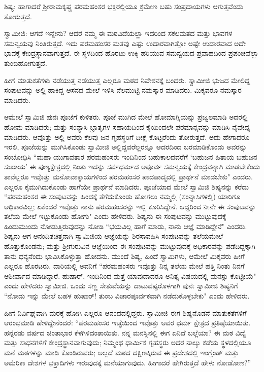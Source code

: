 ಶಿಷ್ಯ: ಹಾಗಾದರೆ ಶ‍್ರೀರಾಮಕೃಷ್ಣ ಪರಮಹಂಸರ ಭಕ್ತರಲ್ಲಿಯೂ ಕ್ರಮೇಣ ಬಹು ಸಂಪ್ರದಾಯಗಳು ಆಗುತ್ತವೆಂದು ತೋರುತ್ತದೆ.

ಸ್ವಾಮೀಜಿ: ಆಗದೆ ಇನ್ನೇನು? ಆದರೆ ನಮ್ಮ ಈ ಮಠವಿದೆಯಲ್ಲಾ ಇದರಿಂದ ಸಕಲಮತದ ಮತ್ತು ಭಾವಗಳ ಸಮನ್ವಯವು ನಿಂತಿರುತ್ತದೆ. ಇದು ಪರಮಹಂಸರ ಮತವು ಎಷ್ಟು ಉದಾರವಾಗಿತ್ತೋ ಅಷ್ಟೇ ಉದಾರವಾದ ಅದೇ ಭಾವಕ್ಕೆ ಕೇಂದ್ರಸ್ಥಾನವಾಗುತ್ತದೆ. ಈ ಸ್ಥಳದಿಂದ ಹೊರಟು ಉಕ್ಕಿ ಹರಿಯುವ ಸಮನ್ವಯದ ಪ್ರವಾಹದಿಂದ ಪ್ರಪಂಚವೆಲ್ಲಾ ತುಂಬಿಹೋಗುತ್ತದೆ.

ಹೀಗೆ ಮಾತುಕತೆಗಳು ನಡೆಯುತ್ತ ನಡೆಯುತ್ತ ಎಲ್ಲರೂ ಮಠದ ನಿವೇಶನಕ್ಕೆ ಬಂದರು. ಸ್ವಾಮೀಜಿ ಭುಜದ ಮೇಲಿದ್ದ ಸಂಪುಟವನ್ನು ಅಲ್ಲಿ ಹಾಕಿದ್ದ ಆಸನದ ಮೇಲೆ ಇಳಿಸಿ ನೆಲಮುಟ್ಟಿ ನಮಸ್ಕಾರ ಮಾಡಿದರು. ಮಿಕ್ಕವರೂ ನಮಸ್ಕಾರ ಮಾಡಿದರು.

ಆಮೇಲೆ ಸ್ವಾಮಿಜಿ ಪುನಃ ಪೂಜೆಗೆ ಕುಳಿತರು. ಪೂಜೆ ಮುಗಿದ ಮೇಲೆ ಹೋಮಾಗ್ನಿಯನ್ನು ಪ್ರಜ್ವಲಮಾಡಿ ಅದರಲ್ಲಿ ಹೋಮ ಮಾಡಿದರು; ಮತ್ತು ಸಂನ್ಯಾಸಿ ಭ್ರಾತೃಗಳ ಸಹಾಯದಿಂದ ಕೈಯಿಂದಲೇ ಪರಮಾನ್ನವನ್ನು ಮಾಡಿಸಿ ನೈವೇದ್ಯ ಮಾಡಿದರು. ಆವೊತ್ತು ಅಲ್ಲಿ ಅವರು ಕೆಲವು ಜನ ಗೃಹಸ್ಥರಿಗೆ ದೀಕ್ಷೆ ಕೊಟ್ಟರೆಂದು ತೋರುತ್ತದೆ. ಅದು ಹೇಗಾದರೂ ಇರಲಿ, ಪೂಜೆಯನ್ನು ಮುಗಿಸಿಕೊಂಡು ಸ್ವಾಮೀಜಿ ಅಲ್ಲಿದ್ದವರೆಲ್ಲರನ್ನೂ ಆದರದಿಂದ ಬರಮಾಡಿಕೊಂಡು ಅವರನ್ನು ಸಂಬೋಧಿಸಿ “ಮಹಾ ಯುಗಾವತಾರ ಪರಮಹಂಸರು ಇಂದಿನಿಂದ ಬಹುಕಾಲದವರೆಗೆ ‘ಬಹುಜನ ಹಿತಾಯ ಬಹುಜನ ಸುಖಾಯ’ ಈ ಪುಣ್ಯಕ್ಷೇತ್ರದಲ್ಲಿ ನಿಂತು ಇದನ್ನು ಸರ್ವಧರ್ಮದ ಅಪೂರ್ವ ಸಮನ್ವಯಕ್ಕೆ ಕೇಂದ್ರವನ್ನಾಗಿ ಮಾಡಬೇಕೆಂದು ತಾವೆಲ್ಲರೂ ಇವೊತ್ತು ಮನೋವಾಕ್ಕಾಯಗಳಿಂದ ಪರಮಹಂಸರ ಪಾದಪಾದ್ಮದಲ್ಲಿ ಪ್ರಾರ್ಥನೆ ಮಾಡಬೇಕು" ಎಂದರು. ಎಲ್ಲರೂ ಕೈಮುಗಿದುಕೊಂಡು ಹಾಗೆಯೇ ಪ್ರಾರ್ಥನೆ ಮಾಡಿದರು. ಪೂಜೆಯಾದ ಮೇಲೆ ಸ್ವಾಮಿಜಿ ಶಿಷ್ಯನನ್ನು ಕರೆದು “ಪರಮಹಂಸರ ಈ ಸಂಪುಟವನ್ನು ಹಿಂದಕ್ಕೆ ತೆಗೆದುಕೊಂಡು ಹೋಗಲು ನಮ್ಮಲ್ಲಿ (ಸಂನ್ಯಾಸಿಗಳಲ್ಲಿ) ಯಾರಿಗೂ ಅಧಿಕಾರವಿಲ್ಲ; ಏಕೆಂದರೆ ಇವೊತ್ತು ನಾನು ಪರಮಹಂಸರನ್ನು ಇಲ್ಲಿ ಕೂರಿಸಿದ್ದೇನೆ. ಆದ್ದರಿಂದ ನೀನೇ ಈ ಸಂಪುಟವನ್ನು ತಲೆಯ ಮೇಲೆ ಇಟ್ಟುಕೊಂಡು ಹೋಗು" ಎಂದು ಹೇಳಿದರು. ಶಿಷ್ಯನು ಈ ಸಂಪುಟವನ್ನು ಮುಟ್ಟುವುದಕ್ಕೆ ಹಿಂದುಮುಂದು ನೋಡುತ್ತಿರುವುದನ್ನು ನೋಡಿ “ಭಯವಿಲ್ಲ ಹಾಗೆ ಮಾಡು, ನಾನು ಆಜ್ಞೆ ಮಾಡಿದ್ದೇನೆ" ಎಂದರು. ಶಿಷ್ಯನು ಆಗ ಆನಂದಿತಚಿತ್ತನಾಗಿ ಸ್ವಾಮಿಜಿಯ ಆಜ್ಞೆಯನ್ನು ಶಿರಸಾವಹಿಸಿ ಸಂಪುಟವನ್ನು ತಲೆಯಮೇಲೆ ಹೊತ್ತುಕೊಂಡನು; ಮತ್ತು ಶ‍್ರೀಗುರುವಿನ ಆಜ್ಞೆಯಿಂದ ಈ ಸಂಪುಟವನ್ನು ಮುಟ್ಟುವುದಕ್ಕೆ ಅಧಿಕಾರವನ್ನು ಪಡೆದಿದ್ದಕ್ಕಾಗಿ ತಾನು ಧನ್ಯನೆಂದು ಭಾವಿಸಿಕೊಳ್ಳುತ್ತಾ ಹೋದನು. ಮುಂದೆ ಶಿಷ್ಯ, ಹಿಂದೆ ಸ್ವಾಮಿಗಳು, ಆಮೇಲೆ ಮಿಕ್ಕವರು ಹೀಗೆ ಎಲ್ಲರೂ ಹೊರಟರು. ದಾರಿಯಲ್ಲಿ ಅವನಿಗೆ “ಪರಮಹಂಸರು ಇವೊತ್ತು ನಿನ್ನ ತಲೆಯ ಮೇಲೆ ಹತ್ತಿ ನಿಂತು ನಿನಗೆ ಆಶೀರ್ವಾದ ಮಾಡಿದ್ದಾರೆ. ಹುಷಾರ್, ಇಂದಿನಿಂದ ಮತ್ತೆ ಯಾವುದಾದರೂ ಅನಿತ್ಯ ವಿಷಯದಲ್ಲಿ ಮನಸ್ಸು ಕೊಟ್ಟೀಯೆ" ಎಂದು ಹೇಳಿದರು ಸ್ವಾಮೀಜಿ. ಒಂದು ಸಣ್ಣ ಸೇತುವೆಯನ್ನು ದಾಟುವಷ್ಟರೊಳಗಾಗಿ ಪುನಃ ಸ್ವಾಮೀಜಿ ಶಿಷ್ಯನಿಗೆ “ನೋಡು ಇನ್ನು ಮೇಲೆ ಬಹಳ ಹುಷಾರ್! ತುಂಬ ವಿಚಾರಪೂರ್ವಕವಾಗಿ ನಡೆದುಕೊಳ್ಳಬೇಕು" ಎಂದು ಹೇಳಿದರು.

ಹೀಗೆ ನಿರ್ವಿಘ್ನವಾಗಿ ಮಠಕ್ಕೆ ಹೋಗಿ ಎಲ್ಲರೂ ಆನಂದದಲ್ಲಿದ್ದರು. ಸ್ವಾಮೀಜಿ ಈಗ ಶಿಷ್ಯನೊಡನೆ ಮಾತುಕತೆಗಳಿಗೆ ಆರಂಭಮಾಡಿ ಹೇಳಿದ್ದೇನೆಂದರೆ: “ಪರಮಹಂಸರ ಇಚ್ಛೆಯಿಂದ ಇವೊತ್ತು ಅವರ ಧರ್ಮ ಕ್ಷೇತ್ರದ ಪ್ರತಿಷ್ಠೆಯಾಯಿತು. ಹನ್ನೆರಡು ವರ್ಷದ ಚಿಂತಾಭಾರ ಕೆಳಗಿಳಿದಂತಾಯಿತು. ನನ್ನ ಮನಸ್ಸಿನಲ್ಲಿ ಈಗ ಏನಿದೆ ಬಲ್ಲೆಯಾ? ಈ ಮಠ ವಿದ್ಯೆ ಮತ್ತು ಸಾಧನಗಳಿಗೆ ಕೇಂದ್ರಸ್ಥಾನವಾಗುವುದು; ನಿಮ್ಮಂಥ ಧಾರ್ಮಿಕ ಗೃಹಸ್ಥರು ಅದರ ನಾಲ್ಕು ಕಡೆಯ ಸ್ಥಳದಲ್ಲಿಯೂ ಮನೆ ಮಠಗಳನ್ನು ಮಾಡಿ ಕೊಂಡಿರುವರು; ಅಲ್ಲದೆ ಮಠದ ದಕ್ಷಿಣಕ್ಕಿರುವ ಈ ಪ್ರದೇಶದಲ್ಲಿ ಇಂಗ್ಲೆಂಡ್ ಮತ್ತು ಅಮೆರಿಕಾ ದೇಶಗಳ ಭಕ್ತಾದಿಗಳು ಇರುವುದಕ್ಕೆ ಮನೆಯಾಗುವುದು. ಹೀಗಾದರೆ ಹೇಗಿರುತ್ತದೆ ಹೇಳು ನೋಡೋಣ?”

